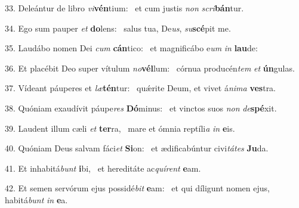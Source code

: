 33. Deleántur de libro \textit{vi}\textbf{vén}tium: \ast\  et cum justis \textit{non} \textit{scri}\textbf{bán}tur.\

34. Ego sum pauper \textit{et} \textbf{do}lens: \ast\  salus tua, De\textit{us}, \textit{su}\textbf{scé}pit me.\

35. Laudábo nomen Dei \textit{cum} \textbf{cán}tico: \ast\  et magnificábo e\textit{um} \textit{in} \textbf{lau}de:\

36. Et placébit Deo super vítulum \textit{no}\textbf{vél}lum: \ast\  córnua producén\textit{tem} \textit{et} \textbf{ún}gulas.\

37. Vídeant páuperes et \textit{læ}\textbf{tén}tur: \ast\  quǽrite Deum, et vivet á\textit{ni}\textit{ma} \textbf{ves}tra.\

38. Quóniam exaudívit páupe\textit{res} \textbf{Dó}minus: \ast\  et vinctos suos \textit{non} \textit{de}\textbf{spé}xit.\

39. Laudent illum cæli \textit{et} \textbf{ter}ra, \ast\  mare et ómnia reptíli\textit{a} \textit{in} \textbf{e}is.\

40. Quóniam Deus salvam fáci\textit{et} \textbf{Si}on: \ast\  et ædificabúntur civi\textit{tá}\textit{tes} \textbf{Ju}da.\

41. Et inhabitá\textit{bunt} \textbf{i}bi, \ast\  et hereditáte ac\textit{quí}\textit{rent} \textbf{e}am.\

42. Et semen servórum ejus possidé\textit{bit} \textbf{e}am: \ast\  et qui díligunt nomen ejus, habitá\textit{bunt} \textit{in} \textbf{e}a.\

